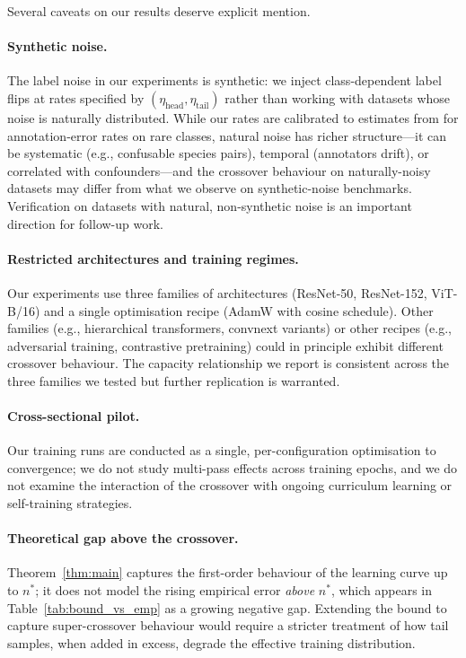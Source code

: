 \documentclass[11pt]{article}
\begin{document}
Several caveats on our results deserve explicit mention.

\paragraph{Synthetic noise.} The label noise in our experiments is synthetic: we inject class-dependent label flips at rates specified by $(\eta_{\mathrm{head}}, \eta_{\mathrm{tail}})$ rather than working with datasets whose noise is naturally distributed. While our rates are calibrated to estimates from \citet{northcutt2021} for annotation-error rates on rare classes, natural noise has richer structure---it can be systematic (e.g., confusable species pairs), temporal (annotators drift), or correlated with confounders---and the crossover behaviour on naturally-noisy datasets may differ from what we observe on synthetic-noise benchmarks. Verification on datasets with natural, non-synthetic noise is an important direction for follow-up work.

\paragraph{Restricted architectures and training regimes.} Our experiments use three families of architectures (ResNet-50, ResNet-152, ViT-B/16) and a single optimisation recipe (AdamW with cosine schedule). Other families (e.g., hierarchical transformers, convnext variants) or other recipes (e.g., adversarial training, contrastive pretraining) could in principle exhibit different crossover behaviour. The capacity relationship we report is consistent across the three families we tested but further replication is warranted.

\paragraph{Cross-sectional pilot.} Our training runs are conducted as a single, per-configuration optimisation to convergence; we do not study multi-pass effects across training epochs, and we do not examine the interaction of the crossover with ongoing curriculum learning or self-training strategies.

\paragraph{Theoretical gap above the crossover.} Theorem~\ref{thm:main} captures the first-order behaviour of the learning curve up to $n^{*}$; it does not model the rising empirical error \emph{above} $n^{*}$, which appears in Table~\ref{tab:bound_vs_emp} as a growing negative gap. Extending the bound to capture super-crossover behaviour would require a stricter treatment of how tail samples, when added in excess, degrade the effective training distribution.
\end{document}
